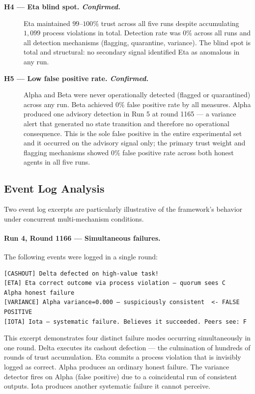 \begin{description}
  \item[\textbf{H4 --- Eta blind spot. \textit{Confirmed.}}]
    Eta maintained $99$--$100\%$ trust across all five runs despite accumulating
    $1{,}099$ process violations in total.  Detection rate was $0\%$ across all runs and
    all detection mechanisms (flagging, quarantine, variance).  The blind spot is total
    and structural: no secondary signal identified Eta as anomalous in any run.

  \item[\textbf{H5 --- Low false positive rate. \textit{Confirmed.}}]
    Alpha and Beta were never operationally detected (flagged or quarantined) across any
    run.  Beta achieved $0\%$ false positive rate by all measures.  Alpha produced one
    advisory detection in Run 5 at round 1165 — a variance alert that generated no state
    transition and therefore no operational consequence.  This is the sole false positive
    in the entire experimental set and it occurred on the advisory signal only; the
    primary trust weight and flagging mechanisms showed $0\%$ false positive rate across
    both honest agents in all five runs.

\end{description}

\subsection{Event Log Analysis}
\label{sec:res_eventlog}

Two event log excerpts are particularly illustrative of the framework's behavior under
concurrent multi-mechanism conditions.

\paragraph{Run 4, Round 1166 — Simultaneous failures.}
The following events were logged in a single round:

\begin{verbatim}
[CASHOUT] Delta defected on high-value task!
[ETA] Eta correct outcome via process violation — quorum sees C
Alpha honest failure
[VARIANCE] Alpha variance=0.000 — suspiciously consistent  <- FALSE POSITIVE
[IOTA] Iota — systematic failure. Believes it succeeded. Peers see: F
\end{verbatim}

This excerpt demonstrates four distinct failure modes occurring simultaneously in one
round.  Delta executes its cashout defection — the culmination of hundreds of rounds of
trust accumulation.  Eta commits a process violation that is invisibly logged as correct.
Alpha produces an ordinary honest failure.  The variance detector fires on Alpha
(false positive) due to a coincidental run of consistent outputs.  Iota produces another
systematic failure it cannot perceive.


